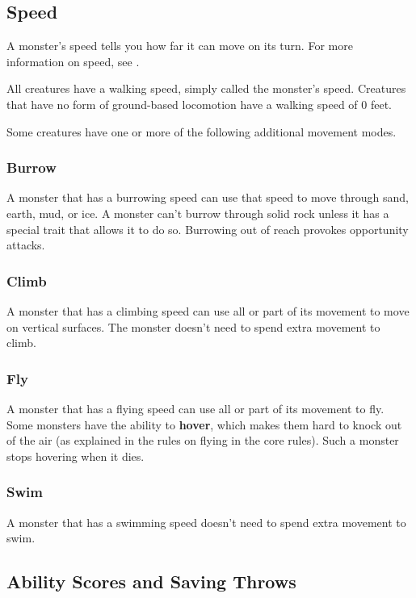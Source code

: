 \subsection{Speed}

A monster's speed tells you how far it can move on its turn. For more information on speed, see .

All creatures have a walking speed, simply called the monster's speed. Creatures that have no form of ground-based locomotion have a walking speed of 0 feet.

Some creatures have one or more of the following additional movement modes.

\subsubsection{Burrow}

A monster that has a burrowing speed can use that speed to move through sand, earth, mud, or ice. A monster can't burrow through solid rock unless it has a special trait that allows it to do so. Burrowing out of reach provokes opportunity attacks.

\subsubsection{Climb}

A monster that has a climbing speed can use all or part of its movement to move on vertical surfaces. The monster doesn't need to spend extra movement to climb.

\subsubsection{Fly}

A monster that has a flying speed can use all or part of its movement to fly. Some monsters have the ability to \textbf{hover}, which makes them hard to knock out of the air (as explained in the rules on flying in the core rules). Such a monster stops hovering when it dies.

\subsubsection{Swim}

A monster that has a swimming speed doesn't need to spend extra movement to swim.

\subsection{Ability Scores and Saving Throws}

